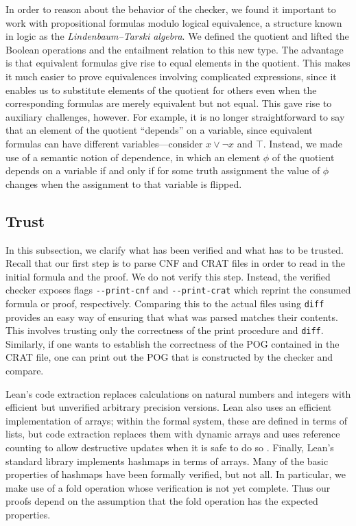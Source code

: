 In order to reason about the behavior of the checker, we found it important to work
with propositional formulas modulo logical equivalence, a structure known in logic
as the \emph{Lindenbaum--Tarski algebra}.
We defined the quotient and lifted the Boolean operations and the entailment
relation to this new type. The advantage is that equivalent formulas give
rise to equal elements in the quotient.
This makes it much easier to prove equivalences involving complicated expressions,
since it enables us to substitute elements of the quotient for others even when the corresponding
formulas are merely equivalent but not equal. This gave rise to auxiliary challenges, however.
For example, it is no longer straightforward to say that an element of the quotient ``depends'' on a variable,
since equivalent formulas can have different variables---consider $x \vee \neg x$ and $\top$.
Instead, we made use of a semantic notion of dependence, in which an element $\phi$ of the
quotient depends on a variable if and only if for some truth assignment the value of $\phi$
changes when the assignment to that variable is flipped.

\subsection{Trust}

In this subsection, we clarify what has been verified and what has to be trusted.
Recall that our first step is to parse CNF and CRAT files in order to read in the initial
formula and the proof. We do not verify this step. Instead, the verified checker exposes
flags \verb+--print-cnf+ and \verb+--print-crat+ which reprint the consumed formula or proof,
respectively. Comparing this to the actual files using {\tt diff} provides an easy way of ensuring
that what was parsed matches their contents. This involves trusting only the correctness of the
print procedure and {\tt diff}. Similarly, if one wants to establish the correctness of the POG
contained in the CRAT file, one can print out the POG that is constructed by the checker and compare.

Lean's code extraction replaces calculations on natural numbers and integers with
efficient but unverified arbitrary precision versions.
Lean also uses an efficient implementation of arrays; within the
formal system, these are defined in terms of lists, but code extraction replaces them
with dynamic arrays and uses reference counting to allow destructive updates when it is safe
to do so \cite{Ullrich:de:Moura:19}.
Finally, Lean's standard library implements hashmaps in terms of arrays.
Many of the basic properties of hashmaps have been formally verified, but not all.
In particular, we make use of a fold operation whose verification is not yet complete.
Thus our proofs depend on the assumption that the fold operation has the
expected properties.

